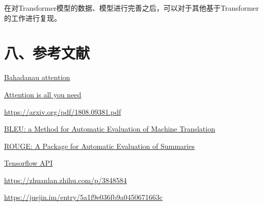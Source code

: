 \documentclass[UTF8,a4paper,10pt]{ctexart}
\begin{document}
在对Transformer模型的数据、模型进行完善之后，可以对于其他基于Transformer的工作进行复现。
\section*{八、参考文献}
\href{https://arxiv.org/pdf/1409.0473.pdf}{\color{blue}Bahadanau attention}

\href{https://arxiv.org/pdf/1706.03762.pdf}{\color{blue}Attention is all you need}

\href{https://arxiv.org/pdf/1808.09381.pdf}{\color{blue}https://arxiv.org/pdf/1808.09381.pdf}

\href{https://www.aclweb.org/anthology/P02-1040.pdf}{\color{blue} BLEU: a Method for Automatic Evaluation of Machine Translation}

\href{https://www.aclweb.org/anthology/W04-1013}{\color{blue} ROUGE: A Package for Automatic Evaluation of Summaries}

\href{https://www.tensorflow.org/api_docs/python/tf}{\color{blue} Tensorflow API}

\href{https://zhuanlan.zhihu.com/p/38485843}{\color{blue}https://zhuanlan.zhihu.com/p/3848584}

\href{https://juejin.im/entry/5a1f9e036fb9a0450671663c}{\color{blue}https://juejin.im/entry/5a1f9e036fb9a0450671663c}
\end{document}
